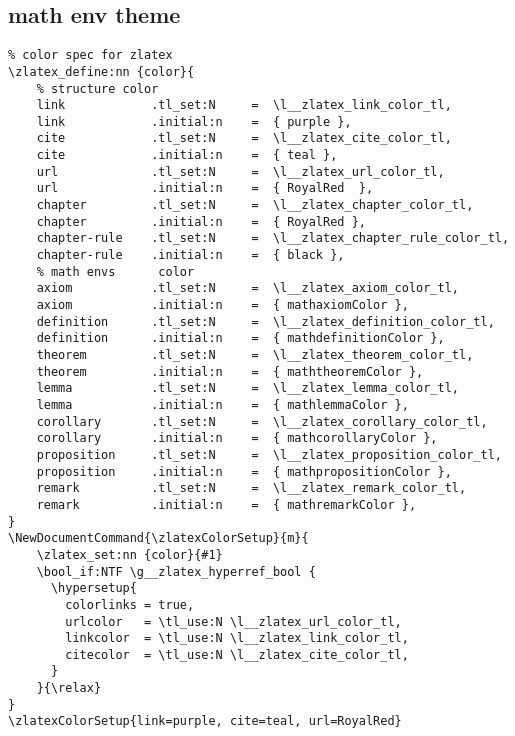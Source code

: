 \subsection{math env theme}
\begin{verbatim}
% color spec for zlatex
\zlatex_define:nn {color}{
    % structure color
    link            .tl_set:N     =  \l__zlatex_link_color_tl,
    link            .initial:n    =  { purple },
    cite            .tl_set:N     =  \l__zlatex_cite_color_tl,
    cite            .initial:n    =  { teal },
    url             .tl_set:N     =  \l__zlatex_url_color_tl,
    url             .initial:n    =  { RoyalRed  },
    chapter         .tl_set:N     =  \l__zlatex_chapter_color_tl,
    chapter         .initial:n    =  { RoyalRed },  
    chapter-rule    .tl_set:N     =  \l__zlatex_chapter_rule_color_tl,
    chapter-rule    .initial:n    =  { black },
    % math envs      color
    axiom           .tl_set:N     =  \l__zlatex_axiom_color_tl,
    axiom           .initial:n    =  { mathaxiomColor },
    definition      .tl_set:N     =  \l__zlatex_definition_color_tl,
    definition      .initial:n    =  { mathdefinitionColor },
    theorem         .tl_set:N     =  \l__zlatex_theorem_color_tl,
    theorem         .initial:n    =  { maththeoremColor },
    lemma           .tl_set:N     =  \l__zlatex_lemma_color_tl,
    lemma           .initial:n    =  { mathlemmaColor },
    corollary       .tl_set:N     =  \l__zlatex_corollary_color_tl,
    corollary       .initial:n    =  { mathcorollaryColor },
    proposition     .tl_set:N     =  \l__zlatex_proposition_color_tl,
    proposition     .initial:n    =  { mathpropositionColor },
    remark          .tl_set:N     =  \l__zlatex_remark_color_tl,
    remark          .initial:n    =  { mathremarkColor },
}
\NewDocumentCommand{\zlatexColorSetup}{m}{
    \zlatex_set:nn {color}{#1}
    \bool_if:NTF \g__zlatex_hyperref_bool {
      \hypersetup{
        colorlinks = true,
        urlcolor   = \tl_use:N \l__zlatex_url_color_tl,
        linkcolor  = \tl_use:N \l__zlatex_link_color_tl,
        citecolor  = \tl_use:N \l__zlatex_cite_color_tl,
      }
    }{\relax}
}
\zlatexColorSetup{link=purple, cite=teal, url=RoyalRed}
\end{verbatim}


